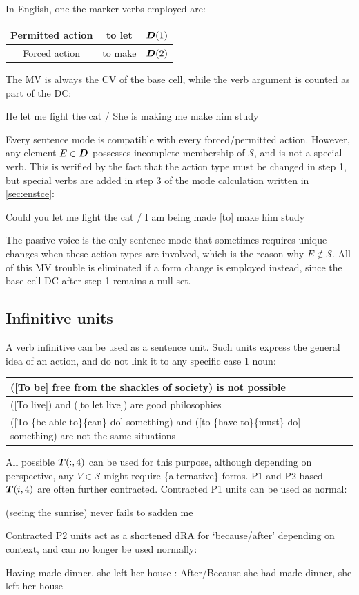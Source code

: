 In English, one  the marker verbs employed are:
\begin{setdef}
    \begin{tabular}{c|c|c}
        Permitted action & to let & $\boldsymbol{D}(1)$\\\hline Forced action & to make & $\boldsymbol{D}(2)$
    \end{tabular}
\end{setdef}
The MV is always the CV of the base cell, while the verb argument is  counted as part of the DC:
\begin{example}
    He let me fight the cat / She is making me make him study
\end{example}
Every sentence mode is compatible with every forced/permitted action. However, any element $E\in\boldsymbol{D}$ possesses incomplete membership of $\mathcal{S}$, and is not a special verb. This is  verified by the fact that the action type must be changed in step 1, but special verbs are added in step 3 of the mode calculation written in \autoref{sec:enstce}:
\begin{example}
        Could you let me fight the cat / I am being made [to] make him study
\end{example}
The passive voice is the only  sentence mode that sometimes requires unique changes when these action types are involved, which is  the reason why $E\notin\mathcal{S}$. All of this MV trouble is eliminated if a form change is employed instead, since the base cell DC after step 1 remains a null set.
\subsection{Infinitive units}
A verb infinitive  can be used as a sentence unit. Such units express the general idea of an action, and do not link it to any specific  case $1$ noun:
\begin{example}
    \begin{tabular}{m{14cm}}
        ([To be] free from the shackles of society) is not possible\\\hline
        ([To live]) and ([to let live]) are good philosophies\\\hline
        ([To \{be able to\}\{can\} do] something) and ([to \{have to\}\{must\} do] something) are not the same situations
    \end{tabular}
\end{example}
All possible $\boldsymbol{T}(:,4)$ can be used for this purpose, although depending on perspective, any $V\in\mathcal{S}$ might require \{alternative\} forms. P1 and P2 based  $\boldsymbol{T}(i,4)$ are often  further contracted. Contracted P1  units can be used as normal:
\begin{example}
    [to be] (seeing the sunrise) never fails to sadden me
\end{example}
Contracted P2 units  act as a shortened dRA for `because/after' depending on context, and can no longer be used normally:
\begin{example}
    Having made dinner, she left her house : After/Because she had made dinner, she left her house
\end{example}
